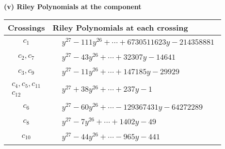 \documentclass[1p]{elsarticle_modified}
\theoremstyle{definition}
\begin{document}
\newpage\renewcommand{\arraystretch}{1}
\flushleft \textbf{(v) Riley Polynomials at the component}\newline \\
\begin{tabular}{m{50pt}|m{274pt}}
Crossings & \hspace{64pt}Riley Polynomials at each crossing \\
\hline $$\begin{aligned}c_{1}\end{aligned}$$&$\begin{aligned}
&y^{27}-111 y^{26}+\cdots+6730511623 y-214358881
\end{aligned}$\\
\hline $$\begin{aligned}c_{2},c_{7}\end{aligned}$$&$\begin{aligned}
&y^{27}-43 y^{26}+\cdots+32307 y-14641
\end{aligned}$\\
\hline $$\begin{aligned}c_{3},c_{9}\end{aligned}$$&$\begin{aligned}
&y^{27}-11 y^{26}+\cdots+147185 y-29929
\end{aligned}$\\
\hline $$\begin{aligned}c_{4},c_{5},c_{11}\\c_{12}\end{aligned}$$&$\begin{aligned}
&y^{27}+38 y^{26}+\cdots+237 y-1
\end{aligned}$\\
\hline $$\begin{aligned}c_{6}\end{aligned}$$&$\begin{aligned}
&y^{27}-60 y^{26}+\cdots-129367431 y-64272289
\end{aligned}$\\
\hline $$\begin{aligned}c_{8}\end{aligned}$$&$\begin{aligned}
&y^{27}-7 y^{26}+\cdots+1402 y-49
\end{aligned}$\\
\hline $$\begin{aligned}c_{10}\end{aligned}$$&$\begin{aligned}
&y^{27}-44 y^{26}+\cdots-965 y-441
\end{aligned}$\\
\hline
\end{tabular}\\~\\
\end{document}
